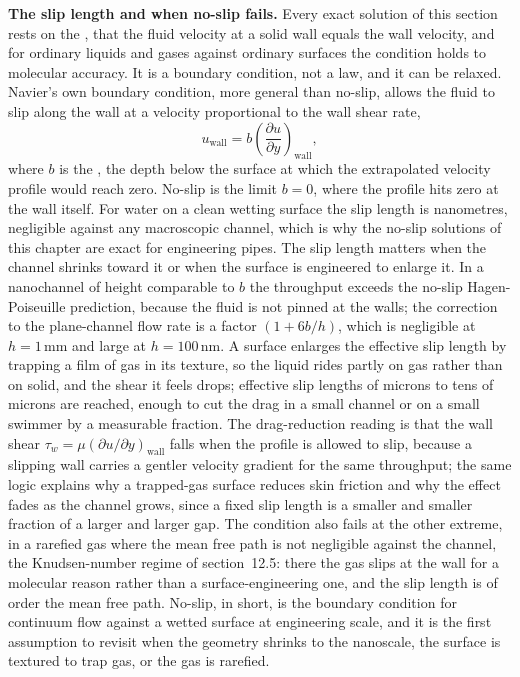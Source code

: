 \begin{mastery}
\textbf{The slip length and when no-slip fails.} Every exact solution of
this section rests on the , that the fluid
velocity at a solid wall equals the wall velocity, and for ordinary
liquids and gases against ordinary surfaces the condition holds to
molecular accuracy. It is a boundary condition, not a law, and it can be
relaxed. Navier's own boundary condition, more general than no-slip,
allows the fluid to slip along the wall at a velocity proportional to the
wall shear rate,
\[
u_{\text{wall}} = b\left(\frac{\partial u}{\partial y}\right)_{
\text{wall}},
\]
where $b$ is the , the depth below the surface at
which the extrapolated velocity profile would reach zero. No-slip is the
limit $b = 0$, where the profile hits zero at the wall itself. For water
on a clean wetting surface the slip length is nanometres, negligible
against any macroscopic channel, which is why the no-slip solutions of
this chapter are exact for engineering pipes. The slip length matters
when the channel shrinks toward it or when the surface is engineered to
enlarge it. In a nanochannel of height comparable to $b$ the throughput
exceeds the no-slip Hagen-Poiseuille prediction, because the fluid is not
pinned at the walls; the correction to the plane-channel flow rate is a
factor $(1 + 6b/h)$, which is negligible at $h = 1\,\si{\milli\meter}$
and large at $h = 100\,\si{\nano\meter}$. A 
surface enlarges the effective slip length by trapping a film of gas in
its texture, so the liquid rides partly on gas rather than on solid, and
the shear it feels drops; effective slip lengths of microns to tens of
microns are reached, enough to cut the drag in a small channel or on a
small swimmer by a measurable fraction. The drag-reduction reading is
that the wall shear $\tau_w = \mu(\partial u/\partial y)_{\text{wall}}$
falls when the profile is allowed to slip, because a slipping wall
carries a gentler velocity gradient for the same throughput; the same
logic explains why a trapped-gas surface reduces skin friction and why
the effect fades as the channel grows, since a fixed slip length is a
smaller and smaller fraction of a larger and larger gap. The condition
also fails at the other extreme, in a rarefied gas where the mean free
path is not negligible against the channel, the Knudsen-number regime of
section~12.5: there the gas slips at the wall for a molecular reason
rather than a surface-engineering one, and the slip length is of order
the mean free path. No-slip, in short, is the boundary condition for
continuum flow against a wetted surface at engineering scale, and it is
the first assumption to revisit when the geometry shrinks to the
nanoscale, the surface is textured to trap gas, or the gas is rarefied.
\end{mastery}

